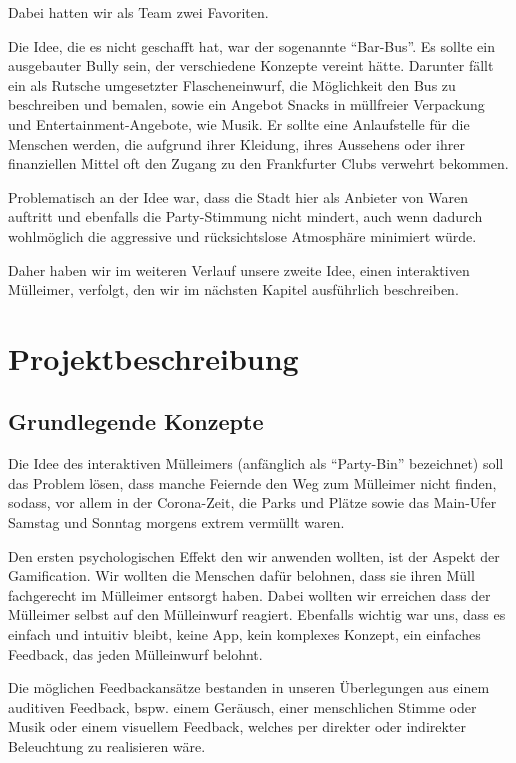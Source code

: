     Dabei hatten wir als Team zwei Favoriten.

    Die Idee, die es nicht geschafft hat, war der sogenannte \enquote{Bar-Bus}. Es sollte ein ausgebauter Bully sein, der verschiedene Konzepte vereint hätte. Darunter fällt ein  als Rutsche umgesetzter Flascheneinwurf, die Möglichkeit den Bus zu beschreiben und bemalen, sowie ein Angebot Snacks in müllfreier Verpackung und Entertainment-Angebote, wie Musik.
    Er sollte eine Anlaufstelle für die Menschen werden, die aufgrund ihrer Kleidung, ihres Aussehens oder ihrer finanziellen Mittel oft den Zugang  zu den Frankfurter Clubs verwehrt bekommen.

    Problematisch an der Idee war, dass die Stadt hier als Anbieter von Waren auftritt und ebenfalls die Party-Stimmung nicht mindert, auch wenn dadurch wohlmöglich die aggressive und rücksichtslose Atmosphäre minimiert würde.

    Daher haben wir im weiteren Verlauf unsere zweite Idee, einen interaktiven Mülleimer, verfolgt, den wir im nächsten Kapitel ausführlich beschreiben.


\chapter{Projektbeschreibung}

\section{Grundlegende Konzepte}
    
    Die Idee des interaktiven Mülleimers (anfänglich als \enquote{Party-Bin} bezeichnet) soll das Problem lösen, dass manche Feiernde den Weg zum Mülleimer nicht finden, sodass, vor allem in der Corona-Zeit, die Parks und Plätze sowie das Main-Ufer Samstag und Sonntag morgens extrem vermüllt waren.

    Den ersten psychologischen Effekt den wir anwenden wollten, ist der Aspekt der Gamification. Wir wollten die Menschen dafür belohnen, dass sie ihren Müll fachgerecht im Mülleimer entsorgt haben. Dabei wollten wir erreichen dass der Mülleimer selbst auf den Mülleinwurf reagiert. Ebenfalls wichtig war uns, dass es einfach und intuitiv bleibt, keine App, kein komplexes Konzept, ein einfaches Feedback, das jeden Mülleinwurf belohnt.

    Die möglichen Feedbackansätze bestanden in unseren Überlegungen aus einem auditiven Feedback, bspw. einem Geräusch, einer menschlichen Stimme oder  Musik oder einem visuellem Feedback, welches per direkter oder indirekter Beleuchtung zu realisieren wäre.

